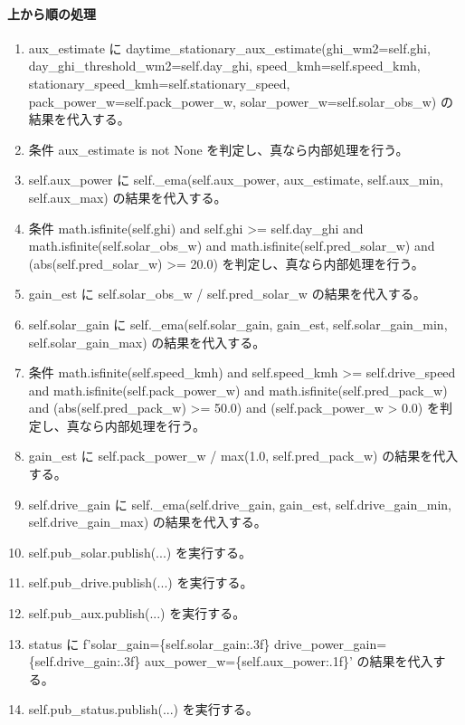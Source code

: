 \documentclass[a4paper,11pt]{article}
\begin{document}
            \paragraph{上から順の処理}
            \begin{enumerate}[leftmargin=1.8em]
            \item aux\_estimate に daytime\_stationary\_aux\_estimate(ghi\_wm2=self.ghi, day\_ghi\_threshold\_wm2=self.day\_ghi, speed\_kmh=self.speed\_kmh, stationary\_speed\_kmh=self.stationary\_speed, pack\_power\_w=self.pack\_power\_w, solar\_power\_w=self.solar\_obs\_w) の結果を代入する。
\item 条件 aux\_estimate is not None を判定し、真なら内部処理を行う。
\item   self.aux\_power に self.\_ema(self.aux\_power, aux\_estimate, self.aux\_min, self.aux\_max) の結果を代入する。
\item 条件 math.isfinite(self.ghi) and self.ghi >= self.day\_ghi and math.isfinite(self.solar\_obs\_w) and math.isfinite(self.pred\_solar\_w) and (abs(self.pred\_solar\_w) >= 20.0) を判定し、真なら内部処理を行う。
\item   gain\_est に self.solar\_obs\_w / self.pred\_solar\_w の結果を代入する。
\item   self.solar\_gain に self.\_ema(self.solar\_gain, gain\_est, self.solar\_gain\_min, self.solar\_gain\_max) の結果を代入する。
\item 条件 math.isfinite(self.speed\_kmh) and self.speed\_kmh >= self.drive\_speed and math.isfinite(self.pack\_power\_w) and math.isfinite(self.pred\_pack\_w) and (abs(self.pred\_pack\_w) >= 50.0) and (self.pack\_power\_w > 0.0) を判定し、真なら内部処理を行う。
\item   gain\_est に self.pack\_power\_w / max(1.0, self.pred\_pack\_w) の結果を代入する。
\item   self.drive\_gain に self.\_ema(self.drive\_gain, gain\_est, self.drive\_gain\_min, self.drive\_gain\_max) の結果を代入する。
\item self.pub\_solar.publish(...) を実行する。
\item self.pub\_drive.publish(...) を実行する。
\item self.pub\_aux.publish(...) を実行する。
\item status に f'solar\_gain=\{self.solar\_gain:.3f\} drive\_power\_gain=\{self.drive\_gain:.3f\} aux\_power\_w=\{self.aux\_power:.1f\}' の結果を代入する。
\item self.pub\_status.publish(...) を実行する。
            \end{enumerate}
\end{document}
